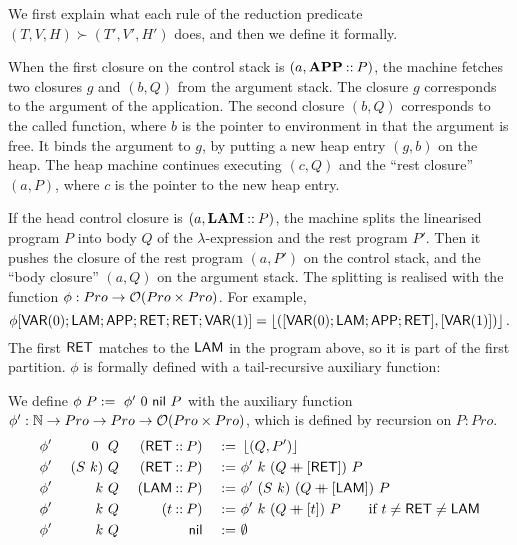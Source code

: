 We first explain what each rule of the reduction predicate $(T,V,H) \succ (T',V',H')$ does, and then we define it formally.


When the first closure on the control stack is $(a, \mathsf{\textbf{APP}} \mathbin{::} P)$, the machine fetches two closures $g$ and
$(b,Q)$ from the argument stack.  The closure $g$ corresponds to the argument of the application.  The second closure
$(b,Q)$ corresponds to the called function, where $b$ is the pointer to environment in that the argument is free.  It binds the argument to
$g$, by putting a new heap entry $(g,b)$ on the heap.  The heap machine continues executing $(c,Q)$ and the ``rest closure'' $(a,P)$, where
$c$ is the pointer to the new heap entry.


If the head control closure is $(a, \mathsf{\mathbf{LAM}} \mathbin{::} P)$, the machine splits the linearised program $P$ into body $Q$ of the
$\lambda$-expression and the rest program $P'$.  Then it pushes the closure of the rest program $(a,P')$ on the control stack, and the ``body
closure'' $(a,Q)$ on the argument stack.  The splitting is realised with the function $\phi : Pro \rightarrow \mathcal{O}(Pro \times Pro)$.  For example, {\small
  \[
    \phi[\mathsf{VAR}(0); \mathsf{LAM}; \mathsf{APP}; \mathsf{RET}; \mathsf{RET}; \mathsf{VAR}(1)] = \left\lfloor {([\ensuremath{\mathsf{VAR}}(0); \ensuremath{\mathsf{LAM}}; \ensuremath{\mathsf{APP}}; \ensuremath{\mathsf{RET}}], [\ensuremath{\mathsf{VAR}}(1)])} \right\rfloor.
  \]
}%
The first $\mathsf{RET}$ matches to the $\mathsf{LAM}$ in the program above, so it is part of the first partition.  $\phi$ is formally defined with a
tail-recursive auxiliary function:
\begin{definition}[$\phi$]
  \label{def:jumpTarget}
  We define $\phi~P :=~ \phi'~0~\mathsf{nil}~P$ with the auxiliary function $\phi' : \mathbb{N} \rightarrow Pro \rightarrow Pro \rightarrow \mathcal{O}(Pro \times Pro)$, which is defined by
  recursion on $P:Pro$.
  \begin{alignat*}{4}
    &\phi'&~0~   &~Q&~(\mathsf{RET} \mathbin{::} P) &&~:=~& \left\lfloor {(Q,P')} \right\rfloor \\
    &\phi'&~(S~k)&~Q&~(\mathsf{RET} \mathbin{::} P) &&~:=~& \phi'~k~(Q \mathbin{+\mkern-10mu+} [\mathsf{RET}])~P \\
    &\phi'&~k    &~Q&~(\mathsf{LAM} \mathbin{::} P) &&~:=~& \phi'~(S~k)~(Q \mathbin{+\mkern-10mu+} [\mathsf{LAM}])~P \\
    &\phi'&~k    &~Q&~(t        \mathbin{::} P) &&~:=~& \phi'~k~(Q \mathbin{+\mkern-10mu+} [t])~P \qquad \text{if $t \neq \mathsf{RET} \neq \mathsf{LAM}$} \\
    &\phi'&~k    &~Q&~              \mathsf{nil} &&~:=~& \emptyset
  \end{alignat*}
\end{definition}


